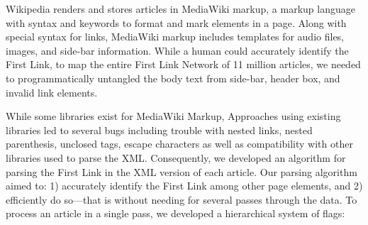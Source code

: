 \documentclass[pre,twocolumn,twoside,superscriptaddress,floatfix, aps, 10pt]{revtex4-1}
\begin{document}
Wikipedia renders and stores articles in MediaWiki markup, a markup language with syntax and keywords to format and mark elements in a page. Along with special syntax for links, MediaWiki markup includes templates for audio files, images, and side-bar
information.
While a human could accurately identify the First Link, to map the entire First Link Network of 11 million articles, we needed to programmatically untangled the body text from side-bar, header box, and invalid link elements.

While some libraries exist for MediaWiki Markup,
Approaches using existing libraries led to several bugs 
including trouble with nested links, nested parenthesis, unclosed tags, escape characters 
as well as compatibility with other libraries used to parse the XML.
Consequently,  we developed an algorithm for parsing the First Link in the XML version of each article.
Our parsing algorithm aimed to: 
1) accurately identify the First Link among other page elements, and 
2) efficiently do so---that is without needing for several passes through the data.
To process an article in a single pass, we developed a hierarchical system of flags:
\end{document}
